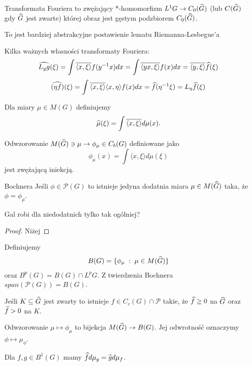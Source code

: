 \begin{theorem}{}{}
  Transformata Fouriera to zwężający *-homomorfizm $L^1G\to C_0(\Hat{G})$ (lub $C(\Hat{G})$ gdy $\Hat{G}$ jest zwarte) której obraz jest gęstym podzbiorem $C_0(\Hat{G})$.
\end{theorem}

To jest bardziej abstrakcyjne postawienie lematu Riemanna-Lesbegue'a

Kilka ważnych własności transformaty Fouriera:
$$\Hat{L_yg}(\xi)=\int\overline{\langle x,\xi\rangle}f(y^{-1}x)dx=\int\overline{\langle yx,\xi\rangle}f(x)dx=\overline{\langle y,\xi\rangle}\Hat{f}(\xi)$$
$$\Hat{(\eta f)}(\xi)=\int\overline{\langle x,\xi\rangle}\langle x,\eta\rangle f(x)dx=\Hat{f}(\eta^{-1}\xi)=L_\eta \Hat{f}(\xi)$$

Dla miary $\mu\in M(G)$ definiujemy 
$$\Hat{\mu}(\xi)=\int\overline{\langle x,\xi\rangle}d\mu(x).$$

\begin{theorem}{}{}
  Odwzorowanie $M(\Hat{G})\ni\mu\to \phi_\mu\in C_b(G)$ definiowane jako
  $$\phi_\mu(x)=\int\langle x,\xi\rangle d\mu(\xi)$$
  jest zwężającą iniekcją.
\end{theorem}

\begin{theorem}{Bochnera}{}
  Jeśli $\phi\in\mathcal{P}(G)$ to istnieje jedyna dodatnia miara $\mu\in M(\Hat{G})$ taka, że $\phi=\phi_\mu$.

  \color{red}Gal robi dla niedodatnich tylko tak ogólniej?
\end{theorem}

\begin{proof}
  Niżej
\end{proof}

Definiujemy 
$$B(G)=\{\phi_\mu\;:\;\mu\in M(\Hat{G})\}$$
oraz $B^p(G)=B(G)\cap L^pG$. Z twierdzenia Bochnera $span\left(\mathcal{P}(G)\right)=B(G)$.

\begin{lemma}{}{}
  Jeśli $K\subseteq\Hat{G}$ jest zwarty to istnieje $f\in C_c(G)\cap \mathcal{P}$ takie, że $\Hat{f}\geq 0$ na $\Hat{G}$ oraz $\Hat{f}>0$ na $K$.
\end{lemma}

Odwzorowanie $\mu\mapsto \phi_\mu$ to bijekcja $M(\Hat{G})\to B(G)$. Jej odwrotność oznaczymy $\phi\mapsto \mu_\phi$.

\begin{theorem}{}{}
  Dla $f,g\in B^1(G)$ mamy $\Hat{f}d\mu_g=\Hat{g}d\mu_f$.
\end{theorem}

